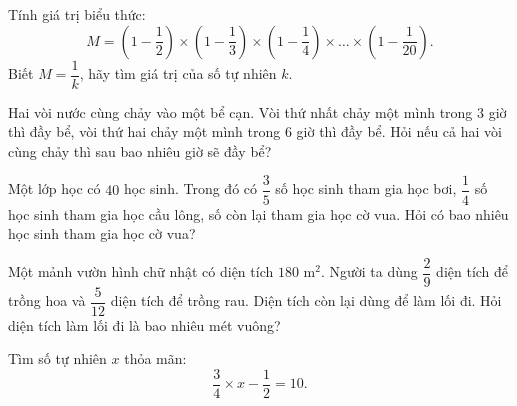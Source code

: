 \begin{ex} %
Tính giá trị biểu thức:
\[
M = \left(1 - \dfrac{1}{2}\right) \times \left(1 - \dfrac{1}{3}\right) \times \left(1 - \dfrac{1}{4}\right) \times \dots \times \left(1 - \dfrac{1}{20}\right).
\]
Biết $M = \dfrac{1}{k}$, hãy tìm giá trị của số tự nhiên $k$.
\end{ex}

\begin{ex} %
Hai vòi nước cùng chảy vào một bể cạn. Vòi thứ nhất chảy một mình trong $3$ giờ thì đầy bể, vòi thứ hai chảy một mình trong $6$ giờ thì đầy bể. Hỏi nếu cả hai vòi cùng chảy thì sau bao nhiêu giờ sẽ đầy bể?
\end{ex}

\begin{ex} %
Một lớp học có $40$ học sinh. Trong đó có $\dfrac{3}{5}$ số học sinh tham gia học bơi, $\dfrac{1}{4}$ số học sinh tham gia học cầu lông, số còn lại tham gia học cờ vua. Hỏi có bao nhiêu học sinh tham gia học cờ vua?
\end{ex}

\begin{ex} %
Một mảnh vườn hình chữ nhật có diện tích $180\text{ m}^2$. Người ta dùng $\dfrac{2}{9}$ diện tích để trồng hoa và $\dfrac{5}{12}$ diện tích để trồng rau. Diện tích còn lại dùng để làm lối đi. Hỏi diện tích làm lối đi là bao nhiêu mét vuông?
\end{ex}

\begin{ex} %
Tìm số tự nhiên $x$ thỏa mãn:
\[
\dfrac{3}{4} \times x - \dfrac{1}{2} = 10.
\]
\end{ex}
